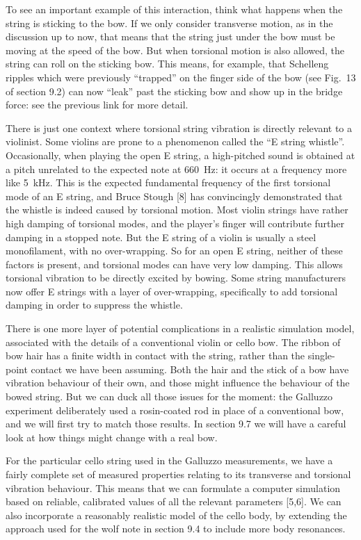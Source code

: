   To see an important example of this interaction, think what happens when the 
  string is sticking to the bow. If we only consider transverse motion, as in 
  the discussion up to now, that means that the string just under the bow must 
  be moving at the speed of the bow. But when torsional motion is also allowed, 
  the string can roll on the sticking bow. This means, for example, that 
  Schelleng ripples which were previously “trapped” on the finger side of the 
  bow (see Fig.\ 13 of section 9.2) can now “leak” past the sticking bow and 
  show up in the bridge force: see the previous link for more detail. 

  There is just one context where torsional string vibration is directly 
  relevant to a violinist. Some violins are prone to a phenomenon called the 
  ``E string whistle''. Occasionally, when playing the open E string, a 
  high-pitched sound is obtained at a pitch unrelated to the expected note at 
  660~Hz: it occurs at a frequency more like 5~kHz. This is the expected 
  fundamental frequency of the first torsional mode of an E string, and Bruce 
  Stough [8] has convincingly demonstrated that the whistle is indeed caused by 
  torsional motion. Most violin strings have rather high damping of torsional 
  modes, and the player's finger will contribute further damping in a stopped 
  note. But the E string of a violin is usually a steel monofilament, with no 
  over-wrapping. So for an open E string, neither of these factors is present, 
  and torsional modes can have very low damping. This allows torsional 
  vibration to be directly excited by bowing. Some string manufacturers now 
  offer E strings with a layer of over-wrapping, specifically to add torsional 
  damping in order to suppress the whistle. 

  There is one more layer of potential complications in a realistic simulation 
  model, associated with the details of a conventional violin or cello bow. The 
  ribbon of bow hair has a finite width in contact with the string, rather than 
  the single-point contact we have been assuming. Both the hair and the stick 
  of a bow have vibration behaviour of their own, and those might influence the 
  behaviour of the bowed string. But we can duck all those issues for the 
  moment: the Galluzzo experiment deliberately used a rosin-coated rod in place 
  of a conventional bow, and we will first try to match those results. In 
  section 9.7 we will have a careful look at how things might change with a 
  real bow. 

  For the particular cello string used in the Galluzzo measurements, we have a 
  fairly complete set of measured properties relating to its transverse and 
  torsional vibration behaviour. This means that we can formulate a computer 
  simulation based on reliable, calibrated values of all the relevant 
  parameters [5,6]. We can also incorporate a reasonably realistic model of the 
  cello body, by extending the approach used for the wolf note in section 9.4 
  to include more body resonances. 

